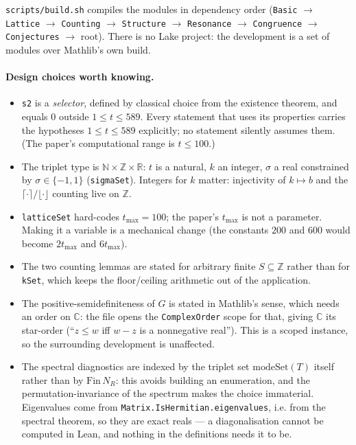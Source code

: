 \documentclass[11pt,a4paper]{article}
\newcommand{\R}{\mathbb{R}}
\newcommand{\N}{\mathbb{N}}
\newcommand{\Z}{\mathbb{Z}}
\newcommand{\C}{\mathbb{C}}
\newcommand{\code}[1]{\texttt{#1}}
\newcommand{\itemization}[1]{\begin{itemize}[leftmargin=1.4em,itemsep=1pt,topsep=2pt]#1\end{itemize}}
\theoremstyle{definition}
\theoremstyle{remark}
\begin{document}
\code{scripts/build.sh} compiles the modules in dependency order
(\code{Basic} $\to$ \code{Lattice} $\to$ \code{Counting} $\to$ \code{Structure} $\to$
\code{Resonance} $\to$ \code{Congruence} $\to$ \code{Conjectures} $\to$ root).  There is no
Lake project: the development is a set of modules over Mathlib's own build.

\paragraph{Design choices worth knowing.}
\itemization{
\item \code{s2} is a \emph{selector}, defined by classical choice from the existence
  theorem, and equals $0$ outside $1\le t\le589$.  Every statement that uses its
  properties carries the hypotheses $1\le t\le589$ explicitly; no statement silently
  assumes them.  (The paper's computational range is $t\le100$.)
\item The triplet type is $\N\times\Z\times\R$: $t$ is a natural, $k$ an integer, $\sigma$
  a real constrained by $\sigma\in\{-1,1\}$ (\code{sigmaSet}).  Integers for $k$ matter:
  injectivity of $k\mapsto b$ and the $\lceil\cdot\rceil/\lfloor\cdot\rfloor$ counting live
  on $\Z$.
\item \code{latticeSet} hard-codes $t_{\max}=100$; the paper's $t_{\max}$ is not a
  parameter.  Making it a variable is a mechanical change (the constants $200$ and $600$
  would become $2t_{\max}$ and $6t_{\max}$).
\item The two counting lemmas are stated for arbitrary finite $S\subseteq\Z$ rather than for
  \code{kSet}, which keeps the floor/ceiling arithmetic out of the application.
\item The positive-semidefiniteness of $G$ is stated in Mathlib's sense, which needs an order
  on $\C$: the file opens the \code{ComplexOrder} scope for that, giving $\C$ its star-order
  (``$z\le w$ iff $w-z$ is a nonnegative real'').  This is a scoped instance, so the
  surrounding development is unaffected.
\item The spectral diagnostics are indexed by the triplet set $\mathrm{modeSet}(T)$ itself
  rather than by $\mathrm{Fin}\,N_R$: this avoids building an enumeration, and the
  permutation-invariance of the spectrum makes the choice immaterial.  Eigenvalues come from
  \code{Matrix.IsHermitian.eigenvalues}, i.e. from the spectral theorem, so they are exact
  reals --- a diagonalisation cannot be computed in Lean, and nothing in the definitions
  needs it to be.
}
\end{document}
